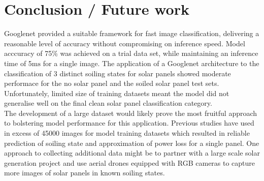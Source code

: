 \documentclass[10pt,journal,compsoc]{IEEEtran}
\begin{document}
		\section{Conclusion / Future work}
		Googlenet provided a suitable framework for fast image classification, delivering a reasonable level of accuracy without compromising on inference speed. Model acccuracy of 75\% was achieved on a trial data set, while maintaining an inference time of 5$\si{\milli\second}$ for a single image. The application of a Googlenet architecture to the classification of 3 distinct soiling states for solar panels showed moderate performace for the no solar panel and the soiled solar panel test sets. Unfortunately, limited size of training datasets meant the model did not generalise well on the final clean solar panel classification category.\\
		
		The development of a large dataset would likely prove the most fruitful approach to bolstering model performance for this application. Previous studies have used in excess of 45000 images for model training datasets which resulted in reliable prediction of soiling state and approximation of power loss for a single panel. One approach to collecting additional data might be to partner with a large scale solar generation project and use aerial drones equipped with RGB cameras to capture more images of solar panels in known soiling states.
			
		
		
			
\end{document}
